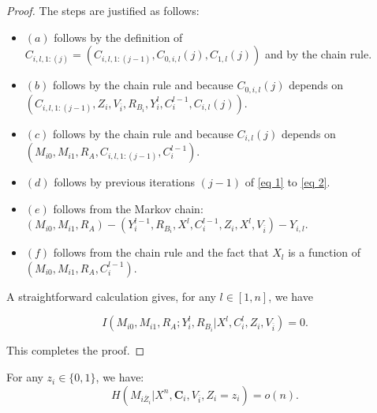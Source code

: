 \documentclass[runningheads]{llncs}
\begin{document}
\begin{proof}
The steps are justified as follows:
\begin{itemize}
    \item $(a)$ follows by the definition of $C_{i, l, 1:(j)} = (C_{i, l, 1:(j-1)}, C_{0, i,l}(j), C_{1, l}(j))$ and by the chain rule.
    \item $(b)$ follows by the chain rule and because $C_{0, i,l}(j)$ depends on\linebreak $(C_{i, l, 1:(j-1)}, Z_i, V_{\overline{i}}, R_{B_i}, Y_i^l, C_i^{l-1}, C_{i,l}(j))$.
    \item $(c)$ follows by the chain rule and because $C_{i,l}(j)$ depends on\linebreak $(M_{i0}, M_{i1}, R_A, C_{i, l, 1:(j-1)}, C_i^{l-1})$.
    \item $(d)$ follows by previous iterations $(j-1)$ of \eqref{eq 1} to \eqref{eq 2}.
    \item $(e)$ follows from the Markov chain:\linebreak $(M_{i0},M_{i1},R_A)-(Y_i^{l-1}, R_{B_i}, X^l, C_i^{l-1}, Z_i, X^l, V_{\overline{i}})-Y_{i,l}$.
    \item $(f)$ follows from the chain rule and the fact that $X_{l}$ is a function of\linebreak $(M_{i0}, M_{i1}, R_A, C_i^{l-1})$.
\end{itemize}

A straightforward calculation gives, for any $l \in [1, n]$, we have

\[
I(M_{i0}, M_{i1}, R_A; Y_i^l, R_{B_i} | X^l, C_i^{l}, Z_i, V_{\overline{i}}) = 0.
\]

This completes the proof.
\end{proof}
\begin{lemma}\label{lemma: smooth}
For any $z_i\in \{0, 1\}$, we have:
    \begin{equation*}
        H(M_{i\overline{Z}_i}|X^n, \mathbf{C}_i, V_{\overline{i}},Z_i = z_i) = o(n).
    \end{equation*}
\end{lemma}
\end{document}
